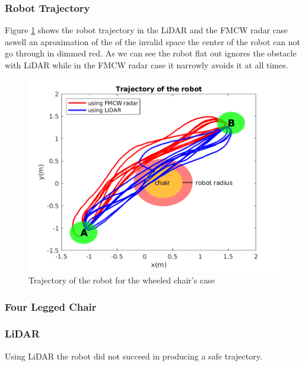 \subsubsection*{Robot Trajectory}
Figure \ref{fig:traj1} shows the robot trajectory in the \ac{LiDAR} and the \ac{FMCW} radar case aswell an aproximation of the of the invalid space the  center of the robot can not go through in dimmed red. As we can see the robot flat out ignores the obstacle with \ac{LiDAR} while in the \ac{FMCW} \ac{radar} case it narrowly avoids it at all times.
\begin{figure}[ht!]
\centerline{\includegraphics [width=0.7 \textwidth]{imgs/chapter5/traj1.png}}
\caption{Trajectory of the robot for the wheeled chair's case}
\label{fig:traj1}
\end{figure}


\subsubsection{Four Legged Chair}
\subsubsection*{LiDAR}
Using \ac{LiDAR} the robot did not succeed in producing a safe trajectory.

